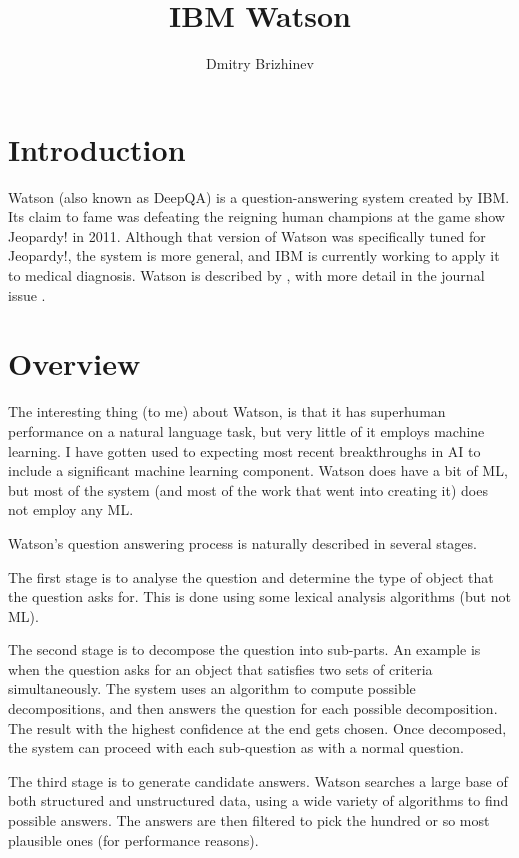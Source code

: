 \documentclass[10pt,a4paper]{article}
\begin{document}
\title{\vspace{-10ex}IBM Watson}
\author{Dmitry Brizhinev}
\maketitle

\section{Introduction}
Watson (also known as DeepQA) is a question-answering system created by IBM. Its claim to fame was defeating the reigning human champions at the game show Jeopardy! in 2011. Although that version of Watson was specifically tuned for Jeopardy!, the system is more general, and IBM is currently working to apply it to medical diagnosis. Watson is described by \cite{watsonbase}, with more detail in the journal issue \cite{watsonjournal}.

\section{Overview}
The interesting thing (to me) about Watson, is that it has superhuman performance on a natural language task, but very little of it employs machine learning. I have gotten used to expecting most recent breakthroughs in AI to include a significant machine learning component. Watson does have a bit of ML, but most of the system (and most of the work that went into creating it) does not employ any ML.

Watson's question answering process is naturally described in several stages.

The first stage is to analyse the question and determine the type of object that the question asks for. This is done using some lexical analysis algorithms (but not ML).

The second stage is to decompose the question into sub-parts. An example is when the question asks for an object that satisfies two sets of criteria simultaneously. The system uses an algorithm to compute possible decompositions, and then answers the question for each possible decomposition. The result with the highest confidence at the end gets chosen. Once decomposed, the system can proceed with each sub-question as with a normal question.

The third stage is to generate candidate answers. Watson searches a large base of both structured and unstructured data, using a wide variety of algorithms to find possible answers. The answers are then filtered to pick the hundred or so most plausible ones (for performance reasons).
\end{document}
